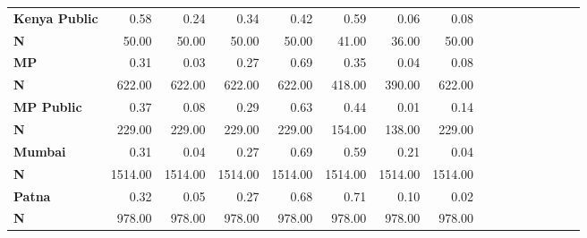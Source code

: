 \begin{tabular}{@{\extracolsep{5pt}}lrrrrrrrrrrrrrrr}
{\bf Kenya Public} & 0.58\phantom{***} & 0.24\phantom{***} & 0.34\phantom{***} & 0.42\phantom{***} & 0.59\phantom{***} & 0.06\phantom{***} & 0.08\phantom{***} \\
{\bf N} & 50.00\phantom{***} & 50.00\phantom{***} & 50.00\phantom{***} & 50.00\phantom{***} & 41.00\phantom{***} & 36.00\phantom{***} & 50.00\phantom{***} \\
{\bf MP} & 0.31\phantom{***} & 0.03\phantom{***} & 0.27\phantom{***} & 0.69\phantom{***} & 0.35\phantom{***} & 0.04\phantom{***} & 0.08\phantom{***} \\
{\bf N} & 622.00\phantom{***} & 622.00\phantom{***} & 622.00\phantom{***} & 622.00\phantom{***} & 418.00\phantom{***} & 390.00\phantom{***} & 622.00\phantom{***} \\
{\bf MP Public} & 0.37\phantom{***} & 0.08\phantom{***} & 0.29\phantom{***} & 0.63\phantom{***} & 0.44\phantom{***} & 0.01\phantom{***} & 0.14\phantom{***} \\
{\bf N} & 229.00\phantom{***} & 229.00\phantom{***} & 229.00\phantom{***} & 229.00\phantom{***} & 154.00\phantom{***} & 138.00\phantom{***} & 229.00\phantom{***} \\
{\bf Mumbai} & 0.31\phantom{***} & 0.04\phantom{***} & 0.27\phantom{***} & 0.69\phantom{***} & 0.59\phantom{***} & 0.21\phantom{***} & 0.04\phantom{***} \\
{\bf N} & 1514.00\phantom{***} & 1514.00\phantom{***} & 1514.00\phantom{***} & 1514.00\phantom{***} & 1514.00\phantom{***} & 1514.00\phantom{***} & 1514.00\phantom{***} \\
{\bf Patna} & 0.32\phantom{***} & 0.05\phantom{***} & 0.27\phantom{***} & 0.68\phantom{***} & 0.71\phantom{***} & 0.10\phantom{***} & 0.02\phantom{***} \\
{\bf N} & 978.00\phantom{***} & 978.00\phantom{***} & 978.00\phantom{***} & 978.00\phantom{***} & 978.00\phantom{***} & 978.00\phantom{***} & 978.00\phantom{***} \\
\hline
\end{tabular}
